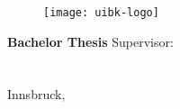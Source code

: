\frontmatter
\pagestyle{empty}


\begin{titlepage}
\rule{0mm}{1mm}
\vspace*{10mm}

\begin{center}
	\begin{figure}
		\centering
		\texttt{[image: uibk-logo]}
	\end{figure}	
	\vskip 25mm
	{\LARGE\bf \MTitle}
	\vskip 5mm
	\vskip 1cm
	{\Large \textbf{\MAuthor}}\vskip 15mm
	\vskip 15mm
	\textbf{\large Bachelor Thesis}    
	\vskip 3cm
	{\large Supervisor:\\}
	{\MSupervisor\\}
	{\large \MInstitution\\}
	{\large \MOrg}    
	\vfill
	{\large Innsbruck, \MDate} 
\end{center}
\end{titlepage} 

\ClearShipoutPicture
